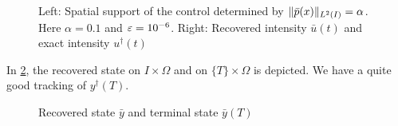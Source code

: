 \begin{figure}[htb]
\centering
\subfloat{}
\subfloat{}\quad
\caption{Left: Spatial support of the control determined by $\lVert\bar p(x)\rVert_{L^2(I)} = \alpha$. Here $\alpha = 0.1$ and $\varepsilon = 10^{-6}$. Right: Recovered intensity $\bar u(t)$ and exact intensity $u^\dag(t)$ }
\label{support}
\end{figure}
In \cref{recoveredstate}, the recovered state on $I\times \Omega$ and on $\{T\}\times\Omega$ is depicted. We have a quite good tracking of $y^\dag(T)$.
\begin{figure}[htb]
\centering
{}\quad
\subfloat{}
\caption{Recovered state $\bar y$ and terminal state $\bar y(T)$}
\label{recoveredstate}
\end{figure}

